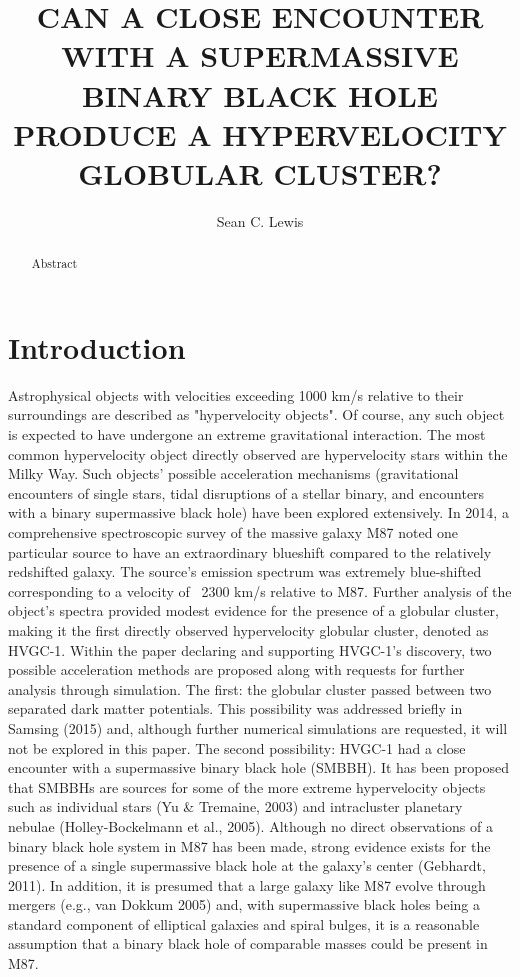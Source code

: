 \documentclass{aastex62}
\begin{document}
\title{CAN A CLOSE ENCOUNTER WITH A SUPERMASSIVE BINARY BLACK HOLE PRODUCE A HYPERVELOCITY GLOBULAR CLUSTER?}

\author{Sean C. Lewis}



\begin{abstract}

Abstract

\end{abstract}
\section{Introduction} \label{sec:intro}
Astrophysical objects with velocities exceeding 1000 km/s relative to their surroundings are described as  "hypervelocity objects". Of course, any such object is expected to have undergone an extreme gravitational interaction. The most common hypervelocity object directly observed are hypervelocity stars within the Milky Way.  Such objects' possible acceleration mechanisms (gravitational encounters of single stars, tidal disruptions of a stellar binary, and encounters with a binary supermassive black hole) have been explored extensively. In 2014, a comprehensive spectroscopic survey of the massive galaxy M87 noted one particular source to have an extraordinary blueshift compared to the relatively redshifted galaxy. The source's emission spectrum was extremely blue-shifted corresponding to a velocity of ~2300 km/s relative to M87. Further analysis of the object's spectra provided modest evidence for the presence of a globular cluster, making it the first directly observed hypervelocity globular cluster, denoted as HVGC-1. Within the paper declaring and supporting HVGC-1's discovery, two possible acceleration methods are proposed along with requests for further analysis through simulation. The first: the globular cluster passed between two separated dark matter potentials. This possibility was addressed briefly in Samsing (2015) and, although further numerical simulations are requested, it will not be explored in this paper. The second possibility: HVGC-1 had a close encounter with a supermassive binary black hole  (SMBBH). It has been proposed that SMBBHs are sources for some of the more extreme hypervelocity objects such as individual stars (Yu \& Tremaine, 2003) and intracluster planetary nebulae (Holley-Bockelmann et al., 2005). Although no direct observations of a binary black hole system in M87 has been made, strong evidence exists for the presence of a single supermassive black hole at the galaxy's center (Gebhardt, 2011). In addition, it is presumed that a large galaxy like M87 evolve through mergers (e.g., van Dokkum 2005) and, with supermassive black holes being a standard component of elliptical galaxies and spiral bulges, it is a reasonable assumption that a binary black hole of comparable masses could be present in M87. 
\end{document}
